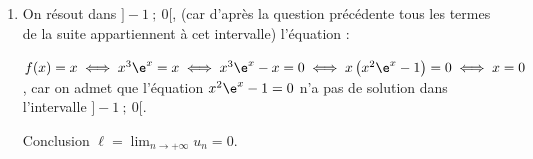 \begin{enumerate}
\begin{enumerate}
La question précédente montre que :
		
$\bullet~~$la suite $\left(u_n\right)$ est croissante ;

$\bullet~~$la suite $\left(u_n\right)$ est majorée par $0$ ;

La suite $\left(u_n\right)$ est donc convergente vers une limite $\ell$, avec $\ell \leqslant 0$.
		\item 




On résout dans $]- 1~;~0[$, (car d'après la question précédente tous les termes de la suite appartiennent à cet intervalle) l'équation  :

$f(x) = x \iff x^3\e^x = x \iff x^3\e^x - x = 0 \iff x\left(x^2\e^x - 1 \right) = 0 \iff x = 0$, car on admet que l'équation $x^2\e^x - 1 = 0$ n'a pas de solution dans l'intervalle $]- 1~;~0[$.

Conclusion $\ell = \displaystyle\lim_{n \to + \infty} u_n = 0$.
	\end{enumerate}
\end{enumerate}

\bigskip
